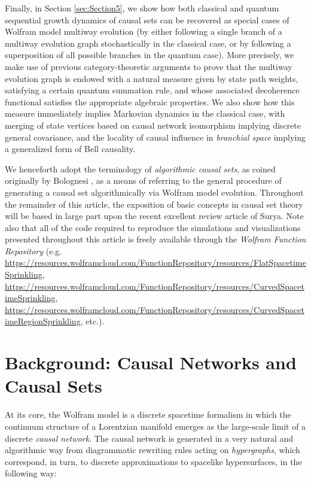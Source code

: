 \documentclass{article}
\begin{document}
Finally, in Section \ref{sec:Section5}, we show how both classical and quantum sequential growth dynamics of causal sets can be recovered as special cases of Wolfram model multiway evolution (by either following a single branch of a multiway evolution graph stochastically in the classical case, or by following a superposition of all possible branches in the quantum case). More precisely, we make use of previous category-theoretic arguments to prove that the multiway evolution graph is endowed with a natural measure given by state path weights, satisfying a certain quantum summation rule, and whose associated decoherence functional satisfies the appropriate algebraic properties. We also show how this measure immediately implies Markovian dynamics in the classical case, with merging of state vertices based on causal network isomorphism implying discrete general covariance, and the locality of causal influence in \textit{branchial space} implying a generalized form of Bell causality.

We henceforth adopt the terminology of \textit{algorithmic causal sets}, as coined originally by Bolognesi \cite{bolognesi}\cite{bolognesi2}, as a means of referring to the general procedure of generating a causal set algorithmically via Wolfram model evolution. Throughout the remainder of this article, the exposition of basic concepts in causal set theory will be based in large part upon the recent excellent review article of Surya\cite{surya}. Note also that all of the code required to reproduce the simulations and visualizations presented throughout this article is freely available through the \textit{Wolfram Function Repository} (e.g. \url{https://resources.wolframcloud.com/FunctionRepository/resources/FlatSpacetimeSprinkling},\\ \url{https://resources.wolframcloud.com/FunctionRepository/resources/CurvedSpacetimeSprinkling},\\ \url{https://resources.wolframcloud.com/FunctionRepository/resources/CurvedSpacetimeRegionSprinkling}, etc.).

\section{Background: Causal Networks and Causal Sets}
\label{sec:Section1}

At its core, the Wolfram model is a discrete spacetime formalism in which the continuum structure of a Lorentzian manifold emerges as the large-scale limit of a discrete \textit{causal network}. The causal network is generated in a very natural and algorithmic way from diagrammatic rewriting rules acting on \textit{hypergraphs}, which correspond, in turn, to discrete approximations to spacelike hypersurfaces, in the following way\cite{gorard}:
\end{document}
